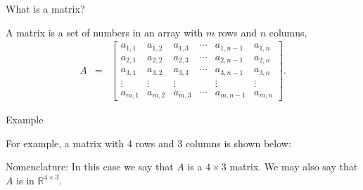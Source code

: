 \documentclass[svgnames,table,,aspectratio=169]{beamer}
\begin{document}
\begin{frame}{What is a matrix?}

  A matrix is a set of numbers in an array with $m$ rows and $n$
  columns,
  \begin{eqnarray*}
    A & = &
            \left[
            \begin{array}{rrrrrr}
              a_{1,1} & a_{1,2} & a_{1,3} & \cdots & a_{1,n-1} & a_{1,n} \\
              a_{2,1} & a_{2,2} & a_{2,3} & \cdots & a_{2,n-1} & a_{2,n} \\
              a_{3,1} & a_{3,2} & a_{3,3} & \cdots & a_{3,n-1} & a_{3,n} \\
              \vdots  & \vdots & \vdots &        & \vdots   & \vdots \\
              a_{m,1} & a_{m,2} & a_{m,3} & \cdots & a_{m,n-1} & a_{m,n} 
            \end{array}
            \right].
  \end{eqnarray*}

\end{frame}

\begin{frame}{Example}

  For example, a matrix with 4 rows and 3 columns is shown below:

  Nomenclature: In this case we say that $A$ is a $4\times 3$
  matrix. We may also say that $A$ is in ${\mathbb R}^{4\times 3}$.
  
  
\end{frame}
\end{document}
